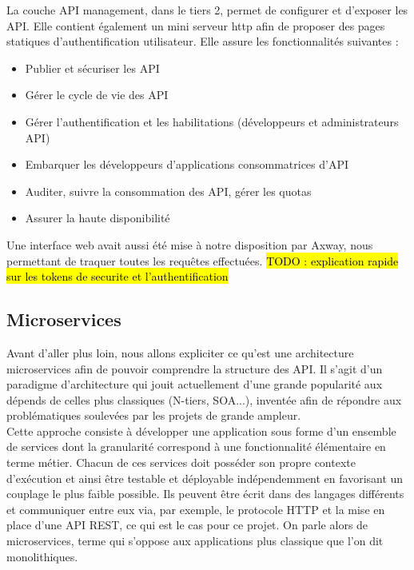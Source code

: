 	La couche API management, dans le tiers 2, permet de configurer et d’exposer les API. Elle contient également un mini serveur http afin de proposer des pages statiques d’authentification utilisateur. Elle assure les fonctionnalités suivantes : \\
	
	\begin{itemize}
		\item Publier et sécuriser les API
		\item Gérer le cycle de vie des API
		\item Gérer l’authentification et les habilitations (développeurs et administrateurs API)
		\item Embarquer les développeurs d’applications consommatrices d’API
		\item Auditer, suivre la consommation des API, gérer les quotas
		\item Assurer la haute disponibilité \\
	\end{itemize}
	
	Une interface web avait aussi été mise à notre disposition par Axway, nous permettant de traquer toutes les requêtes effectuées. \hl{TODO : explication rapide sur les tokens de securite et l'authentification}
	
\subsection{Microservices}

	Avant d'aller plus loin, nous allons expliciter ce qu'est une architecture microservices \cite{bib_microservices} afin de pouvoir comprendre la structure des API. Il s'agit d'un paradigme d'architecture qui jouit actuellement d'une grande popularité aux dépends de celles plus classiques (N-tiers, SOA...), inventée afin de répondre aux problématiques soulevées par les projets de grande ampleur. \\
	
	Cette approche consiste à développer une application sous forme d'un ensemble de services dont la granularité correspond à une fonctionnalité élémentaire en terme métier. Chacun de ces services doit posséder son propre contexte d'exécution et ainsi être testable et déployable indépendemment en favorisant un couplage le plus faible possible. Ils peuvent être écrit dans des langages différents et communiquer entre eux via, par exemple, le protocole HTTP et la mise en place d'une API REST, ce qui est le cas pour ce projet. On parle alors de microservices, terme qui s'oppose aux applications plus classique que l'on dit monolithiques.\\
	
